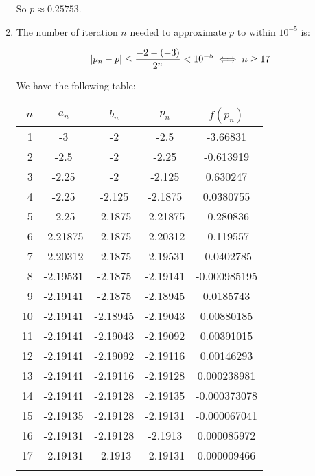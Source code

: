 \documentclass[../../Assignments.tex]{subfiles}
\begin{document}
\begin{solution}
\begin{enumerate}[label=(\alph*)]
            So \(p \approx \num{0.25753}\).

        \item The number of iteration \(n\) needed to approximate \(p\) to
            within \(10^{-5}\) is:

            \[\abs{p_n - p} \leq \frac{-2 - (-3)}{2^n} < 10^{-5} \iff n \geq 17\]

            We have the following table:

            \begin{longtable}{r S[table-format=-1.5] S[table-format=-1.5] S[table-format=-1.5] S[table-format=-1.9]}
                \\
                \toprule
                \(n\)  &  {\(a_n\)}  &  {\(b_n\)}  &  {\(p_n\)}  &  {\(f(p_n)\)}  \\
                  &  -3         &  -2         &  -2.5       &  -3.66831      \\
                    2  &  -2.5       &  -2         &  -2.25      &  -0.613919     \\
                    3  &  -2.25      &  -2         &  -2.125     &   0.630247     \\
                    4  &  -2.25      &  -2.125     &  -2.1875    &   0.0380755    \\
                    5  &  -2.25      &  -2.1875    &  -2.21875   &  -0.280836     \\
                    6  &  -2.21875   &  -2.1875    &  -2.20312   &  -0.119557     \\
                    7  &  -2.20312   &  -2.1875    &  -2.19531   &  -0.0402785    \\
                    8  &  -2.19531   &  -2.1875    &  -2.19141   &  -0.000985195  \\
                    9  &  -2.19141   &  -2.1875    &  -2.18945   &   0.0185743    \\
                   10  &  -2.19141   &  -2.18945   &  -2.19043   &   0.00880185   \\
                   11  &  -2.19141   &  -2.19043   &  -2.19092   &   0.00391015   \\
                   12  &  -2.19141   &  -2.19092   &  -2.19116   &   0.00146293   \\
                   13  &  -2.19141   &  -2.19116   &  -2.19128   &   0.000238981  \\
                   14  &  -2.19141   &  -2.19128   &  -2.19135   &  -0.000373078  \\
                   15  &  -2.19135   &  -2.19128   &  -2.19131   &  -0.000067041  \\
                   16  &  -2.19131   &  -2.19128   &  -2.1913    &   0.000085972  \\
                   17  &  -2.19131   &  -2.1913    &  -2.19131   &   0.000009466  \\
                \bottomrule
                \\
            \end{longtable}


\end{enumerate}
\end{solution}
\end{document}
